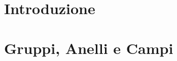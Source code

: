 






\section{Introduzione}

\textsf{\small }


\newpage


\section{Gruppi, Anelli e Campi} %

\textsf{\small }


